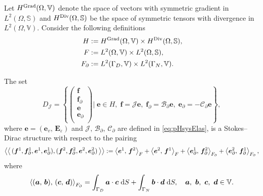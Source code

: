 \begin{conjecture} \label{conj:stdirElas}
Let $H^{\Grad}(\Omega, \mathbb{V})$ denote the space of vectors with symmetric gradient in $L^2(\Omega, \mathbb{S})$ and $H^{\Div}  (\Omega, \mathbb{S})$ be the space of symmetric tensors with divergence in $L^2(\Omega, \mathbb{V})$. Consider the following definitions
\begin{align*}
H &:= H^{\Grad}(\Omega, \mathbb{V}) \times H^{\Div}(\Omega, \mathbb{S}), \\
F &:= L^2(\Omega, \mathbb{V}) \times L^2(\Omega, \mathbb{S}), \\
F_\partial &:= L^2(\Gamma_D, \mathbb{V}) \times L^2(\Gamma_N, \mathbb{V}).
\end{align*}

The set 
\begin{equation}
{D}_{\mathcal{J}} = \left\{
\begin{pmatrix}
\bm{f} \\ \bm{f}_\partial \\ \bm{e} \\ \bm{e}_\partial \\
\end{pmatrix}
\vert \;
 \bm{e} \in H, \; \bm{f} = \mathcal{J} \bm{e}, \;\bm{f}_\partial = \mathcal{B}_\partial \bm{e}, \; \bm{e}_\partial = -\mathcal{C}_\partial \bm{e}   \right\},
\end{equation}
where $\bm{e} = (\bm{e}_v,\, \bm{E}_\varepsilon)$ and $\mathcal{J, \, B_\partial, \,  C_\partial}$ are defined in \eqref{eq:pHsysElas}, is a Stokes–Dirac structure with respect to the pairing
\begin{equation}\label{eq:bilinearElas}
\bilprod{(\bm{f}^1, \bm{f}_{\partial}^1, \bm{e}^1, \bm{e}_{\partial}^1)}{(\bm{f}^2, \bm{f}_{\partial}^2, \bm{e}^2, \bm{e}_{\partial}^2)}  := \inner[F]{\bm{e}^1}{\bm{f}^2} + \inner[F]{\bm{e}^2}{\bm{f}^1} + \inner[F_\partial]{\bm{e}_{\partial}^1}{\bm{f}_{\partial}^2} + \inner[F_\partial]{\bm{e}_{\partial}^2}{\bm{f}_{\partial}^1},
\end{equation}
where 
\begin{equation*}
\inner[F_\partial]{(\bm{a}, \, \bm{b})}{(\bm{c}, \, \bm{d})} = \int_{\Gamma_D} \bm{a} \cdot \bm{c} \d{S} + \int_{\Gamma_N} \bm{b} \cdot \bm{d} \d{S}, \quad \bm{a},\ \bm{b},\ \bm{c},\ \bm{d} \in \mathbb{V}. 
\end{equation*}
\end{conjecture}

